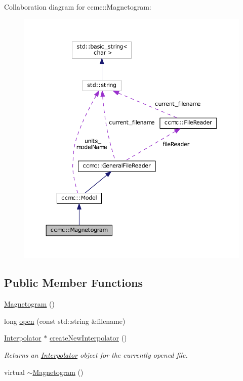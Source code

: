 Collaboration diagram for ccmc\-:\-:Magnetogram\-:
\nopagebreak
\begin{figure}[H]
\begin{center}
\leavevmode
\includegraphics[width=350pt]{classccmc_1_1_magnetogram__coll__graph}
\end{center}
\end{figure}
\subsection*{Public Member Functions}
\begin{DoxyCompactItemize}
\item 
\hyperlink{classccmc_1_1_magnetogram_af35bd68bafd421803fa79807b9c641f3}{Magnetogram} ()
\item 
long \hyperlink{classccmc_1_1_magnetogram_af940dde096c046974a46bf4c12f300fa}{open} (const std\-::string \&filename)
\item 
\hyperlink{classccmc_1_1_interpolator}{Interpolator} $\ast$ \hyperlink{classccmc_1_1_magnetogram_aebea202039a3bf9d21236402db7261f6}{create\-New\-Interpolator} ()
\begin{DoxyCompactList}\small\item\em Returns an \hyperlink{classccmc_1_1_interpolator}{Interpolator} object for the currently opened file. \end{DoxyCompactList}\item 
virtual \hyperlink{classccmc_1_1_magnetogram_afeec893d32919b028608874a8c2d26e3}{$\sim$\-Magnetogram} ()
\end{DoxyCompactItemize}

